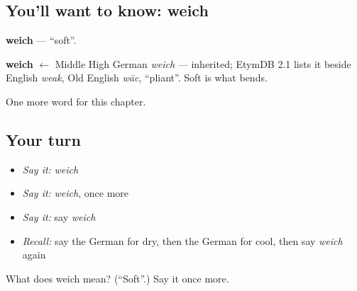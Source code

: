 \subsection*{You'll want to know: weich}
\textbf{weich} — \textquotedblleft{}soft\textquotedblright{}.

\begin{cousinweb}
\textbf{weich} $\leftarrow$ Middle High German \emph{weich} — inherited; EtymDB 2.1 lists it beside English \emph{weak}, Old English \emph{wāc}, \textquotedblleft{}pliant\textquotedblright{}. Soft is what bends.
\end{cousinweb}

\begin{grammarlens}[title={What you've built}]
One more word for this chapter.
\end{grammarlens}

\subsection*{Your turn}
\begin{itemize}
\raggedright
  \item \emph{Say it:} \emph{weich}
  \item \emph{Say it:} \emph{weich}, once more
  \item \emph{Say it:} say \emph{weich}
  \item \emph{Recall:} say the German for dry, then the German for cool, then say \emph{weich} again
\end{itemize}

\begin{tcolorbox}[breakable,colback=teal!4,colframe=teal!35!black,title={Before you move on}]
What does weich mean? (\textquotedblleft{}Soft\textquotedblright{}.) Say it once more.
\end{tcolorbox}
